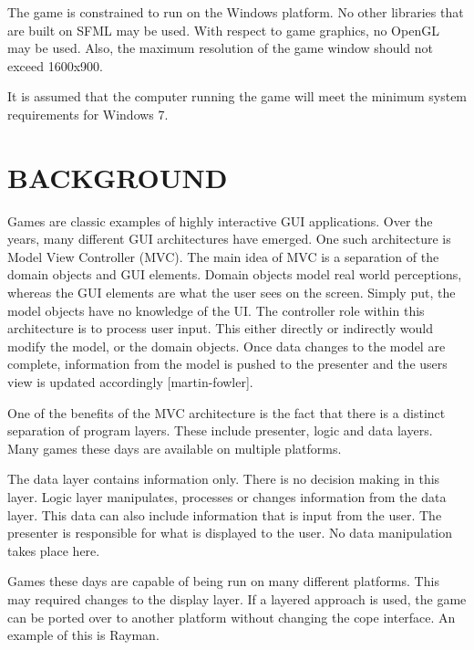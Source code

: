 \documentclass[10pt,twocolumn]{witseiepaper}
\begin{document}
The game is constrained to run on the Windows platform. No other libraries that are built on SFML may be used. With respect to game graphics, no OpenGL may be used. Also, the maximum resolution of the game window should not exceed 1600x900. 

It is assumed that the computer running the game will meet the minimum system requirements for Windows 7. 

%
\section{BACKGROUND}%
Games are classic examples of highly interactive GUI applications. Over the years, many different GUI architectures have emerged. One such architecture is Model View Controller (MVC). The main idea of MVC is a separation of the domain objects and GUI elements. Domain objects model real world perceptions, whereas the GUI elements are what the user sees on the screen. Simply put, the model objects have no knowledge of the UI. The controller role within this architecture is to process user input. This either directly or indirectly would modify the model, or the domain objects. Once data changes to the model are complete, information from the model is pushed to the presenter and the users view is updated accordingly [martin-fowler].

One of the benefits of the MVC architecture is the fact that there is a distinct separation of program layers. These include presenter, logic and data layers. Many games these days are available on multiple platforms.


The data layer contains information only. There is no decision making in this layer. Logic layer manipulates, processes or changes information from the data layer. This data can also include information that is input from the user. The presenter is responsible for what is displayed to the user. No data manipulation takes place here.

Games these days are capable of being run on many different platforms. This may required changes to the display layer. If a layered approach is used, the game can be ported over to another platform without changing the cope interface. An example of this is Rayman. 

\end{document}
